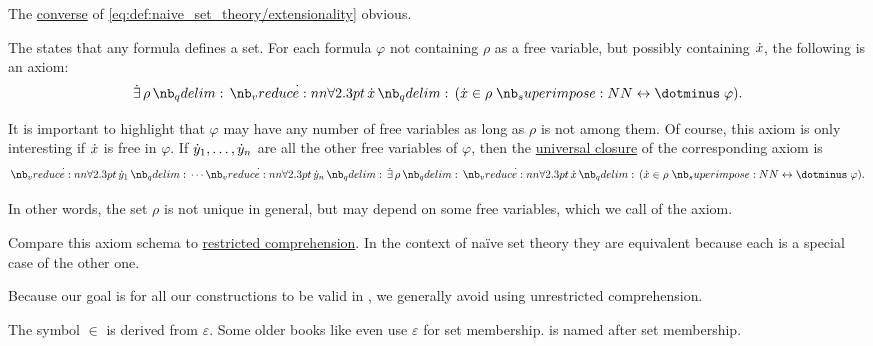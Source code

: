 \begin{definition}
\begin{thmenum}
    The \hyperref[def:conditional_formula/converse]{converse} of \eqref{eq:def:naive_set_theory/extensionality} obvious.

     The  states that any formula defines a set. For each formula \( \varphi \) not containing \( \rho \) as a free variable, but possibly containing \( {\dot{x}} \), the following is an axiom:
    \begin{equation}\label{eq:def:naive_set_theory/unrestricted_comprehension}
      \qexists \rho \qforall \synx (\synx \in \rho \syniff \varphi).
    \end{equation}

    It is important to highlight that \( \varphi \) may have any number of free variables as long as \( \rho \) is not among them. Of course, this axiom is only interesting if \( {\dot{x}} \) is free in \( \varphi \). If \( {\dot{y}}_1, \ldots, {\dot{y}}_n \) are all the other free variables of \( \varphi \), then the \hyperref[def:universal_closure]{universal closure} of the corresponding axiom is
    \begin{equation}\label{eq:def:naive_set_theory/unrestricted_comprehension_quantified}
      \qforall {\syny_1} \cdots \qforall {\syny_n} \qexists \rho \qforall \synx (\synx \in \rho \syniff \varphi).
    \end{equation}

    In other words, the set \( \rho \) is not unique in general, but may depend on some free variables, which we call  of the axiom.

    Compare this axiom schema to \hyperref[def:zfc/specification]{restricted comprehension}. In the context of na\"ive set theory they are equivalent because each is a special case of the other one.

    Because our goal is for all our constructions to be valid in \hyperref[def:zfc]{}, we generally avoid using unrestricted comprehension.
  \end{thmenum}
\end{definition}

\begin{remark}\label{rem:epsilon_and_set_membership}
  The symbol \( \in \) is derived from \( \varepsilon \). Some older books like \cite{Kelley1975Topology} even use \( \varepsilon \) for set membership.  is named after set membership.
\end{remark}

